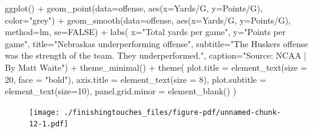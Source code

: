 \documentclass[
  letterpaper,
  DIV=11,
  numbers=noendperiod]{scrreprt}
\newenvironment{Shaded}{\begin{snugshade}}{\end{snugshade}}
\newcommand{\AttributeTok}[1]{\textcolor[rgb]{0.40,0.45,0.13}{#1}}
\newcommand{\ConstantTok}[1]{\textcolor[rgb]{0.56,0.35,0.01}{#1}}
\newcommand{\DecValTok}[1]{\textcolor[rgb]{0.68,0.00,0.00}{#1}}
\newcommand{\FunctionTok}[1]{\textcolor[rgb]{0.28,0.35,0.67}{#1}}
\newcommand{\NormalTok}[1]{\textcolor[rgb]{0.00,0.23,0.31}{#1}}
\newcommand{\SpecialCharTok}[1]{\textcolor[rgb]{0.37,0.37,0.37}{#1}}
\newcommand{\StringTok}[1]{\textcolor[rgb]{0.13,0.47,0.30}{#1}}
\begin{document}
\begin{Shaded}
\begin{Highlighting}[]
\FunctionTok{ggplot}\NormalTok{() }\SpecialCharTok{+} 
  \FunctionTok{geom\_point}\NormalTok{(}\AttributeTok{data=}\NormalTok{offense, }\FunctionTok{aes}\NormalTok{(}\AttributeTok{x=}\StringTok{\textasciigrave{}}\AttributeTok{Yards/G}\StringTok{\textasciigrave{}}\NormalTok{, }\AttributeTok{y=}\StringTok{\textasciigrave{}}\AttributeTok{Points/G}\StringTok{\textasciigrave{}}\NormalTok{), }\AttributeTok{color=}\StringTok{"grey"}\NormalTok{) }\SpecialCharTok{+} 
  \FunctionTok{geom\_smooth}\NormalTok{(}\AttributeTok{data=}\NormalTok{offense, }\FunctionTok{aes}\NormalTok{(}\AttributeTok{x=}\StringTok{\textasciigrave{}}\AttributeTok{Yards/G}\StringTok{\textasciigrave{}}\NormalTok{, }\AttributeTok{y=}\StringTok{\textasciigrave{}}\AttributeTok{Points/G}\StringTok{\textasciigrave{}}\NormalTok{), }\AttributeTok{method=}\NormalTok{lm, }\AttributeTok{se=}\ConstantTok{FALSE}\NormalTok{) }\SpecialCharTok{+} 
  \FunctionTok{labs}\NormalTok{(}
    \AttributeTok{x=}\StringTok{"Total yards per game"}\NormalTok{, }
    \AttributeTok{y=}\StringTok{"Points per game"}\NormalTok{, }
    \AttributeTok{title=}\StringTok{"Nebraska\textquotesingle{}s underperforming offense"}\NormalTok{, }
    \AttributeTok{subtitle=}\StringTok{"The Husker\textquotesingle{}s offense was the strength of the team. They underperformed."}\NormalTok{, }
    \AttributeTok{caption=}\StringTok{"Source: NCAA | By Matt Waite"}\NormalTok{) }\SpecialCharTok{+} 
  \FunctionTok{theme\_minimal}\NormalTok{() }\SpecialCharTok{+} 
  \FunctionTok{theme}\NormalTok{(}
    \AttributeTok{plot.title =} \FunctionTok{element\_text}\NormalTok{(}\AttributeTok{size =} \DecValTok{20}\NormalTok{, }\AttributeTok{face =} \StringTok{"bold"}\NormalTok{),}
    \AttributeTok{axis.title =} \FunctionTok{element\_text}\NormalTok{(}\AttributeTok{size =} \DecValTok{8}\NormalTok{), }
    \AttributeTok{plot.subtitle =} \FunctionTok{element\_text}\NormalTok{(}\AttributeTok{size=}\DecValTok{10}\NormalTok{), }
    \AttributeTok{panel.grid.minor =} \FunctionTok{element\_blank}\NormalTok{()}
\NormalTok{    ) }
\end{Highlighting}
\end{Shaded}

\begin{figure}[H]

{\centering \texttt{[image: ./finishingtouches\_files/figure-pdf/unnamed-chunk-12-1.pdf]}

}

\end{figure}
\end{document}
